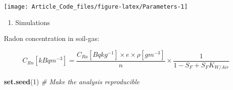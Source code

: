 \documentclass[
  12pt,
]{article}
\newenvironment{Shaded}{\begin{snugshade}}{\end{snugshade}}
\newcommand{\CommentTok}[1]{\textcolor[rgb]{0.56,0.35,0.01}{\textit{#1}}}
\newcommand{\DecValTok}[1]{\textcolor[rgb]{0.00,0.00,0.81}{#1}}
\newcommand{\KeywordTok}[1]{\textcolor[rgb]{0.13,0.29,0.53}{\textbf{#1}}}
\newcommand{\NormalTok}[1]{#1}
\providecommand{\tightlist}{%
  \setlength{\itemsep}{0pt}\setlength{\parskip}{0pt}}
\begin{document}
\begin{center}\texttt{[image: Article\_Code\_files/figure-latex/Parameters-1]} \end{center}

\begin{enumerate}
\def\labelenumi{\alph{enumi})}
\setcounter{enumi}{1}
\tightlist
\item
  Simulations
\end{enumerate}

Radon concentration in soil-gas:

\[C_{Rn} [kBq m^{-3}] = \frac{C_{Ra} [Bq kg^{-1}] \times e \times \rho [g m^{-3}]}{n} \times \frac{1}{1 - S_F + S_FK_{W/Air}}\]

\begin{Shaded}
\begin{Highlighting}[]
  \KeywordTok{set.seed}\NormalTok{(}\DecValTok{1}\NormalTok{) }\CommentTok{\# Make the analysis reproducible}


\end{Highlighting}
\end{Shaded}
\end{document}
